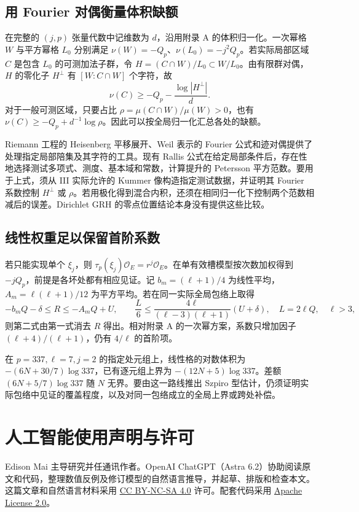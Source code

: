 \documentclass[UTF8,fontset=none,zihao=-4,a4paper]{ctexart}
\newcommand{\OO}{\mathcal O}
\begin{document}
\subsection{用 Fourier 对偶衡量体积缺额}
在完整的 \((j,p)\) 张量代数中记维数为 \(d\)，沿用附录 A 的体积归一化。一次幂格 \(W\) 与平方幂格 \(L_0\) 分别满足 \(\nu(W)=-Q_p\)、\(\nu(L_0)=-j^2Q_p\)。若实际局部区域 \(C\) 是包含 \(L_0\) 的可测加法子群，令 \(H=(C\cap W)/L_0\subset W/L_0\)。由有限群对偶，\(H\) 的零化子 \(H^\perp\) 有 \([W:C\cap W]\) 个字符，故
\[
 \nu(C)\ge -Q_p-\frac{\log|H^\perp|}{d}.
\]
对于一般可测区域，只要占比 \(\rho=\mu(C\cap W)/\mu(W)>0\)，也有 \(\nu(C)\ge -Q_p+d^{-1}\log\rho\)。因此可以按全局归一化汇总各处的缺额。

Riemann 工程的 Heisenberg 平移展开、Weil 表示的 Fourier 公式和迹对偶提供了处理指定局部陪集及其字符的工具。现有 Rallis 公式在给定局部条件后，存在性地选择测试多项式、测度、基本域和常数，计算提升的 Petersson 平方范数。要用于上式，须从 III 实际允许的 Kummer 像构造指定测试数据，并证明其 Fourier 系数控制 \(H^\perp\) 或 \(\rho\)。若用极化得到混合内积，还须在相同归一化下控制两个范数相减后的误差。Dirichlet GRH 的零点位置结论本身没有提供这些比较。\cite{riemtheta}

\subsection{线性权重足以保留首阶系数}
若只能实现单个 \(\xi_j\)，则 \(\tau_p(\xi_j)\OO_E=r^j\OO_E\)。在单有效槽模型按次数加权得到 \(-jQ_p\)，前提是各坏处都有相应见证。记 \(b_m=(\ell+1)/4\) 为线性平均，\(A_m=\ell(\ell+1)/12\) 为平方平均。若在同一实际全局包络上取得
\[
 -b_mQ-\delta\le R\le-A_mQ+U,
 \qquad
 \frac{L}{6}\le \frac{4\ell}{(\ell-3)(\ell+1)}(U+\delta),
 \quad L=2\ell Q,\quad\ell>3,
\]
则第二式由第一式消去 \(R\) 得出。相对附录 A 的一次幂方案，系数只增加因子 \((\ell+4)/(\ell+1)\)，仍有 \(4/\ell\) 的首阶项。

{\setlength{\emergencystretch}{2em}在 \(p=337,\ell=7,j=2\) 的指定处元组上，线性格的对数体积为 \(-(6N+30/7)\log337\)，已有逐元组上界为 \(-(12N+5)\log337\)。差额 \((6N+5/7)\log337\) 随 \(N\) 无界。要由这一路线推出 Szpiro 型估计，仍须证明实际包络中见证的覆盖程度，以及对同一包络成立的全局上界或跨处补偿。\par}

\section*{人工智能使用声明与许可}
Edison Mai 主导研究并任通讯作者。OpenAI ChatGPT（Astra 6.2）协助阅读原文和代码，整理数值反例及修订模型的自然语言推导，并起草、排版和检查本文。这篇文章和自然语言材料采用 \href{https://creativecommons.org/licenses/by-nc-sa/4.0/}{CC BY-NC-SA 4.0} 许可。配套代码采用 \href{https://www.apache.org/licenses/LICENSE-2.0}{Apache License 2.0}。
\end{document}
